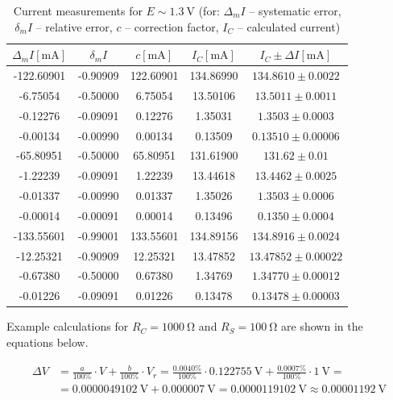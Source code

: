 \begin{table}[H]
	\centering
	\begin{tabular}{ c | c | c | c | c  }
	$\Delta_m I [\unit{\milli\ampere}]$ & $\delta_m I $ & $c [\unit{\milli\ampere}]$ & $ I_C [\unit{\milli\ampere}]$ & $I_C \pm \Delta I [\unit{\milli\ampere}]$\\
		\hline
		-122.60901	&-0.90909	&122.60901	&134.86990&$134.8610\pm 0.0022$\\
		-6.75054	&-0.50000	&6.75054	&13.50106&$13.5011\pm 0.0011$\\
		-0.12276	&-0.09091	&0.12276	&1.35031&$1.3503\pm 0.0003$\\
		-0.00134	&-0.00990	&0.00134	&0.13509&$0.13510\pm 0.00006$\\
		-65.80951&	-0.50000	&65.80951	&131.61900&$131.62\pm 0.01$\\
		-1.22239	&-0.09091	&1.22239	&13.44618&$13.4462\pm 0.0025$\\
		-0.01337	&-0.00990	&0.01337	&1.35026&$1.3503\pm 0.0006$\\
		-0.00014	&-0.00091	&0.00014	&0.13496&$0.1350\pm 0.0004$\\
		-133.55601	&-0.99001	&133.55601	&134.89156&$134.8916\pm 0.0024$\\
		-12.25321	&-0.90909	&12.25321&	13.47852&$13.47852\pm 0.00022$\\
		-0.67380	&-0.50000	&0.67380&	1.34769&$1.34770\pm 0.00012$\\
		-0.01226	&-0.09091	&0.01226&	0.13478&$0.13478\pm 0.00003$\\
	\end{tabular}
	\caption{Current measurements for $E\sim\SI{1.3}{\volt}$ (for: $\Delta_m I$ --  systematic error, $\delta_m I$ --  relative error, $c$ -- correction factor, $ I_C$ --  calculated current)}
	\label{tab:indirect_digital_3}
\end{table}

Example calculations for $R_C = \SI{1000}{\ohm}$ and $R_S = \SI{100}{\ohm}$ are shown in the equations below.

\begin{equation}
	\begin{split}
		\Delta V &= \frac{a}{100\unit{\percent}}\cdot V + 	\frac{b}{100\unit{\percent}}\cdot V_r = \frac{0.0040\unit{\percent}}{100\unit{\percent}}\cdot\SI{0.122755}{\volt} + \frac{0.0007\unit{\percent}}{100\unit{\percent}}\cdot\SI{1}{\volt} =\\
		&= \SI{0.0000049102}{\volt} + \SI{0.000007}{\volt} = \SI{0.0000119102}{\volt}\approx\SI{0.00001192}{\volt}
	\end{split}
\end{equation}

